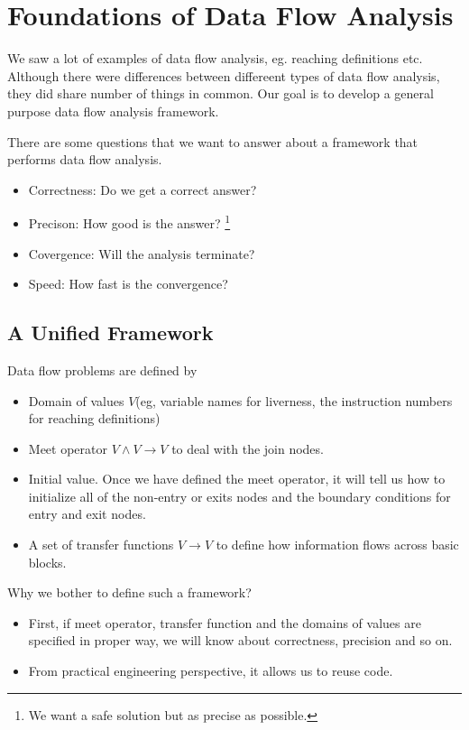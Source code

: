 \section{Foundations of Data Flow Analysis}



We saw a lot of examples of data flow analysis, eg. reaching definitions etc. Although 
there were differences between differeent types of data flow analysis, they did share number of 
things in common. Our goal is to develop a general purpose data flow analysis framework.


There are some questions that we want to answer about a framework that performs data 
flow analysis.

\begin{itemize}
\item Correctness: Do we get a correct answer? 
\item Precison: How good is the answer? \footnote{We want a safe solution but as precise as possible. }
\item Covergence: Will the analysis terminate? 
\item Speed: How fast is the convergence?
\end{itemize}



\subsection{A Unified Framework}

Data flow problems are defined by 
\begin{itemize}

\item Domain of values \( V \)(eg, variable names for liverness, the instruction numbers for reaching definitions)
\item Meet operator \( V \wedge V \rightarrow V \) to deal with the join nodes.
\item Initial value. Once we have defined the meet operator, it will tell us how to initialize 
all of the non-entry or exits nodes and the boundary conditions for entry and exit nodes. 
\item A set of transfer functions \( V  \rightarrow V \) to define how information flows across basic blocks. 
\end{itemize}   



Why we bother to define such a framework?
\begin{itemize}
\item First, if meet operator, transfer function and the domains of values are specified in proper way, we will know about 
correctness, precision and so on. 

\item From practical engineering perspective, it allows us to reuse code.
\end{itemize}   


